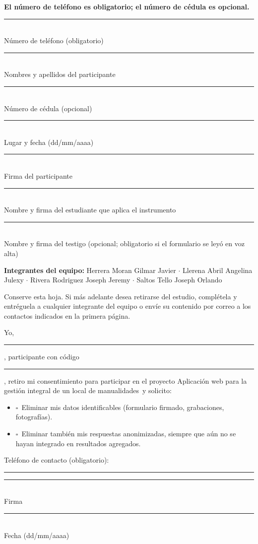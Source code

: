 \documentclass[11pt,a4paper]{article}
\newcommand{\Proyecto}{Aplicaci{\'o}n web para la gesti{\'o}n integral de un local de manualidades}
\newcommand{\caja}{\(\square\)}
\newcommand{\lineafirma}[1]{\parbox[t]{0.46\linewidth}{\centering\rule{\linewidth}{0.5pt}\\[-1pt]\small #1}}
\begin{document}
	\textbf{El número de teléfono es obligatorio; el número de cédula es opcional.}

	\vspace{20pt}
    \noindent\lineafirma{Número de teléfono (obligatorio)}\hfill
    \lineafirma{Nombres y apellidos del participante}

    \vspace{16pt}
    \noindent\lineafirma{Número de cédula (opcional)}\hfill
    \lineafirma{Lugar y fecha (dd/mm/aaaa)}

    \vspace{16pt}
    \noindent\lineafirma{Firma del participante}\hfill
    \lineafirma{Nombre y firma del estudiante que aplica el instrumento}

    \vspace{16pt}
    \noindent\lineafirma{Nombre y firma del testigo (opcional; obligatorio si el formulario se leyó en voz alta)}

    \vspace{40pt}

    \noindent
    {\footnotesize\color{uteqverde}
    \textbf{Integrantes del equipo:}
    Herrera Moran Gilmar Javier $\cdot$
    Llerena Abril Angelina Julexy $\cdot$
    Rivera Rodriguez Joseph Jeremy $\cdot$
    Saltos Tello Joseph Orlando
    }

	\clearpage
	\begin{tcolorbox}[enhanced,colback=white,colframe=uteqverde,boxrule=0.8pt,arc=1.5mm,borderline={0.6pt}{3pt}{uteqverde,dashed},title={\bfseries 9. Revocación del consentimiento (opcional) --- desprendible para el participante},fonttitle=\normalsize,coltitle=white,colbacktitle=uteqverde]
		Conserve esta hoja. Si más adelante desea retirarse del estudio, complétela y entréguela a cualquier integrante del equipo o envíe su contenido por correo a los contactos indicados en la primera página.

		\vspace{10pt}
		Yo, \rule{7.5cm}{0.4pt}, participante con código \rule{2.6cm}{0.4pt}, retiro mi consentimiento para participar en el proyecto \Proyecto\ y solicito:
		\begin{itemize}[label={}]
			\item \caja\ Eliminar mis datos identificables (formulario firmado, grabaciones, fotografías).
			\item \caja\ Eliminar también mis respuestas anonimizadas, siempre que aún no se hayan integrado en resultados agregados.
		\end{itemize}

		\vspace{12pt}
		Teléfono de contacto (obligatorio): \rule{5cm}{0.4pt}

		\vspace{26pt}
		\noindent\lineafirma{Firma}\hfill\lineafirma{Fecha (dd/mm/aaaa)}
	\end{tcolorbox}
\end{document}
